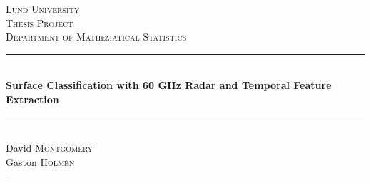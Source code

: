 \begin{titlepage}
\newcommand{\HRule}{\rule{\linewidth}{0.5mm}}

\center
 
\textsc{\LARGE Lund University}\\[1.5cm]
\textsc{\Large Thesis Project}\\[0.5cm]
\textsc{\large Department of Mathematical Statistics}\\[0.5cm]

\HRule \\[0.4cm]
	{ \huge \bfseries \textsf{Surface Classification with 60 GHz Radar and Temporal Feature Extraction}}\\[0.1cm]
\HRule \\[1.5cm]
 

\Large David \textsc{Montgomery} \\
\Large Gaston \textsc{Holm\'en} \\

\vfill-

\end{titlepage}
